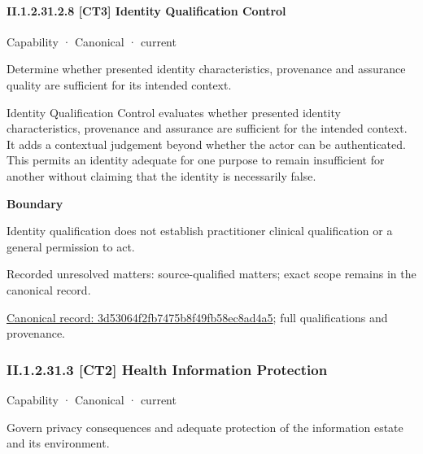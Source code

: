 \paragraph*{II.1.2.31.2.8 [CT3] Identity Qualification Control}
\label{navigation:II.1.2.31.2.8}

\label{element:3d53064f2fb7475b8f49fb58ec8ad4a5}
{\small Capability · Canonical · current}\par

Determine whether presented identity characteristics, provenance and assurance quality are sufficient for its intended context.



Identity Qualification Control evaluates whether presented identity characteristics, provenance and assurance are sufficient for the intended context. It adds a contextual judgement beyond whether the actor can be authenticated. This permits an identity adequate for one purpose to remain insufficient for another without claiming that the identity is necessarily false.



\textbf{Boundary}



Identity qualification does not establish practitioner clinical qualification or a general permission to act.


{\small Recorded unresolved matters: source-qualified matters; exact scope remains in the canonical record.}\par
{\footnotesize \href{../../../../continuum/strategy/capability/3d53064f2fb7475b8f49fb58ec8ad4a5.md}{Canonical record: 3d53064f2fb7475b8f49fb58ec8ad4a5}; full qualifications and provenance.}\par
\subsubsection*{II.1.2.31.3 [CT2] Health Information Protection}
\label{navigation:II.1.2.31.3}

\label{element:4ae0de8fa16840d09ab2ef3f5545a5e7}
{\small Capability · Canonical · current}\par

Govern privacy consequences and adequate protection of the information estate and its environment.



